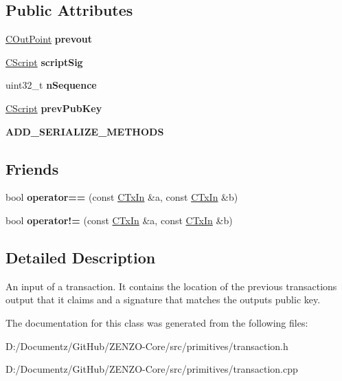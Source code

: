 \subsection*{Public Attributes}
\begin{DoxyCompactItemize}
\item 
\mbox{\label{class_c_tx_in_aed9312051a25380cbd7f123408ab7c20}} 
\mbox{\hyperlink{class_c_out_point}{C\+Out\+Point}} {\bfseries prevout}
\item 
\mbox{\label{class_c_tx_in_aba540fd902366210a6ad6cd9a18fe763}} 
\mbox{\hyperlink{class_c_script}{C\+Script}} {\bfseries script\+Sig}
\item 
\mbox{\label{class_c_tx_in_a635deeaf3ca4e8b3e1a97054607211b9}} 
uint32\+\_\+t {\bfseries n\+Sequence}
\item 
\mbox{\label{class_c_tx_in_a91732c5ffb13520a6989b162ff6683fc}} 
\mbox{\hyperlink{class_c_script}{C\+Script}} {\bfseries prev\+Pub\+Key}
\item 
\mbox{\label{class_c_tx_in_aad2fd3fef5ad4ebe7e54c0db0cc34be4}} 
{\bfseries A\+D\+D\+\_\+\+S\+E\+R\+I\+A\+L\+I\+Z\+E\+\_\+\+M\+E\+T\+H\+O\+DS}
\end{DoxyCompactItemize}
\subsection*{Friends}
\begin{DoxyCompactItemize}
\item 
\mbox{\label{class_c_tx_in_a1bb37c4cd8573c3014a194e8ce4d8daa}} 
bool {\bfseries operator==} (const \mbox{\hyperlink{class_c_tx_in}{C\+Tx\+In}} \&a, const \mbox{\hyperlink{class_c_tx_in}{C\+Tx\+In}} \&b)
\item 
\mbox{\label{class_c_tx_in_a4188c5f0807185c03e80598a7a3ace72}} 
bool {\bfseries operator!=} (const \mbox{\hyperlink{class_c_tx_in}{C\+Tx\+In}} \&a, const \mbox{\hyperlink{class_c_tx_in}{C\+Tx\+In}} \&b)
\end{DoxyCompactItemize}


\subsection{Detailed Description}
An input of a transaction. It contains the location of the previous transaction\textquotesingle{}s output that it claims and a signature that matches the output\textquotesingle{}s public key. 

The documentation for this class was generated from the following files\+:\begin{DoxyCompactItemize}
\item 
D\+:/\+Documentz/\+Git\+Hub/\+Z\+E\+N\+Z\+O-\/\+Core/src/primitives/transaction.\+h\item 
D\+:/\+Documentz/\+Git\+Hub/\+Z\+E\+N\+Z\+O-\/\+Core/src/primitives/transaction.\+cpp\end{DoxyCompactItemize}
